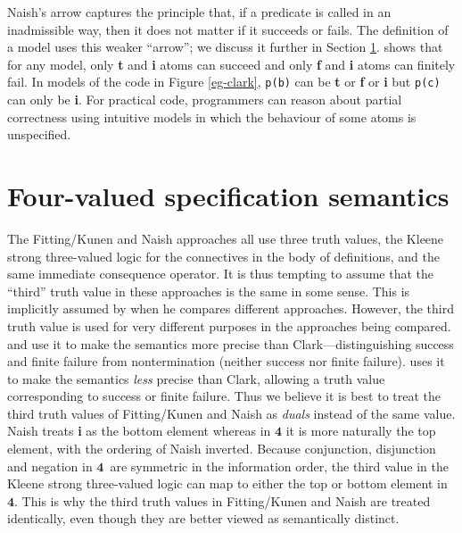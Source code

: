 \documentclass{tlp}
\newcommand{\Quad}{\ensuremath{\mathbf{4}}}
\begin{document}
\vspace*{0.6em}\noindent
Naish's arrow captures the principle that, 
if a predicate is called in an inadmissible way, 
then it does not matter if it succeeds or fails.  
The definition of
a model uses this weaker ``arrow''; we discuss it further in Section
\ref{sec-generalised}.   shows that for any model,
only \textbf{t} and \textbf{i} atoms can succeed and only \textbf{f}
and \textbf{i} atoms can finitely fail.  In models of the code in
Figure \ref{eg-clark}, \texttt{p(b)} can be \textbf{t} or \textbf{f}
or \textbf{i} but \texttt{p(c)} can only be \textbf{i}.  For practical
code, programmers can reason about partial correctness using intuitive
models in which the behaviour of some atoms is unspecified.



\section{Four-valued specification semantics}
\label{sec-generalised}


The Fitting/Kunen and Naish approaches all use three truth values,
the Kleene strong three-valued logic for the connectives in the body of
definitions, and the same immediate consequence operator.  It is thus
tempting to assume that the ``third'' truth value in these approaches
is the same in some sense.  This is implicitly assumed by 
when he compares different approaches.
However, the third truth value is used for very different purposes in
the approaches being compared.  
 and  use it to make the semantics 
more precise than Clark---distinguishing success and finite failure 
from nontermination (neither success nor finite failure).  
 uses it to make the semantics
\emph{less} precise than Clark, allowing a truth value corresponding
to success or finite failure.  Thus we believe it is best to treat the
third truth values of Fitting/Kunen and Naish as \emph{duals} instead 
of the same value. Naish treats \textbf{i} as the bottom element
whereas in $\Quad$ it is more naturally the top element, with the
ordering of Naish inverted.
Because conjunction, disjunction and negation in \Quad\ are
symmetric in the information order, the third value in the Kleene strong
three-valued logic can map to either the top or bottom element in \Quad.
This is why the third truth values in Fitting/Kunen and Naish are treated
identically, even though they are better viewed as semantically distinct.
\end{document}
